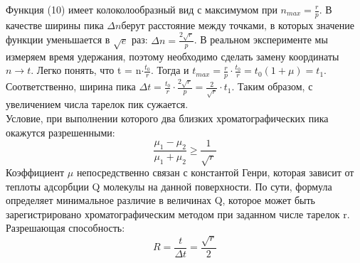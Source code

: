 \documentclass[12pt]{article}
\begin{document}
\begin{flushleft}
	Функция (10) имеет колоколообразный вид с максимумом при $n_{max} =  \frac{r}{p}$. В качестве ширины пика $\Delta n$берут расстояние между точками, в которых значение функции уменьшается в $\sqrt{e}$ раз: $\Delta n = \frac{2\sqrt{r}}{p}$. В реальном эксперименте мы измеряем время удержания, поэтому необходимо сделать замену координаты $n \rightarrow t$. Легко понять, что t = n$\cdot\frac{t_0}{r}$. Тогда и $t_{max} = \frac{r}{p}\cdot\frac{t_0}{r} = t_0(1 + \mu) = t_1$. Соответственно, ширина пика $\Delta t = \frac{t_0}{r}\cdot\frac{2\sqrt{r}}{p} = \frac{2}{\sqrt{r}}\cdot t_1$. Таким образом, с увеличением числа тарелок пик сужается.\\
Условие, при выполнении которого два близких хроматографических пика окажутся разрешенными:
\begin{equation}
\frac{\mu_1 - \mu_2 }{\mu_1 + \mu_2} \geq \frac{1}{\sqrt{r}}
\end{equation}
Коэффициент $\mu$ непосредственно связан с константой Генри, которая зависит от теплоты
адсорбции Q молекулы на данной поверхности. По сути, формула определяет
минимальное различие в величинах Q, которое может быть зарегистрировано
хроматографическим методом при заданном числе тарелок r. \\
Разрешающая способность:
\begin{equation}
R=\frac{t}{\Delta t}=\frac{\sqrt{r}}{2}
\end{equation}

\end{flushleft}
\end{document}
